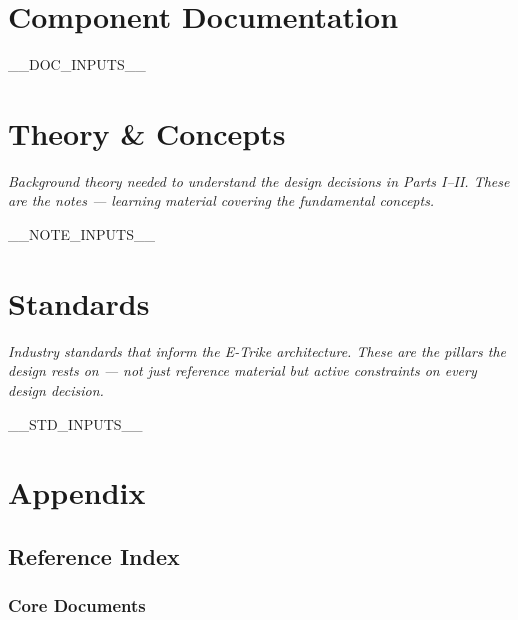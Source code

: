 \documentclass[12pt,a4paper,oneside]{report}
\begin{document}
\part{Component Documentation}
\label{part:docs}

__DOC_INPUTS__


\part{Theory \& Concepts}
\label{part:notes}

\textit{Background theory needed to understand the design decisions in Parts I--II. These are the notes --- learning material covering the fundamental concepts.}

__NOTE_INPUTS__


\part{Standards}
\label{part:standards}

\textit{Industry standards that inform the E-Trike architecture. These are the pillars the design rests on --- not just reference material but active constraints on every design decision.}

__STD_INPUTS__


\appendix
\part*{Appendix}

\chapter{Reference Index}

\section{Core Documents}
\end{document}
